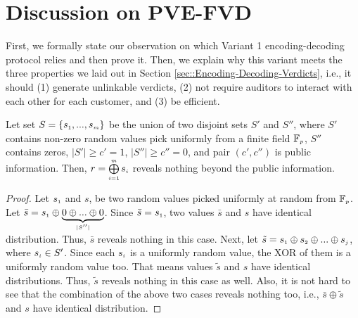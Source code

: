 

\vspace{-3mm}



\section{Discussion on PVE-FVD}\label{sec::Variant-1-Theorem-proof}
\vspace{-.6mm}

First, we formally state our observation on which  Variant 1 encoding-decoding protocol relies and then prove it. Then, we explain why this variant meets the three properties we laid out in Section \ref{sec::Encoding-Decoding-Verdicts}, i.e., it should (1) generate unlinkable verdicts, (2) not require auditors to interact with each other for each customer, and (3) be efficient.

\vspace{-2mm}

\begin{theorem}\label{set-xor}
Let set $S=\{s_{\scriptscriptstyle 1},..., s_{\scriptscriptstyle m}\}$ be the union of  two disjoint sets $S'$ and $S''$, where $S'$ contains non-zero random values pick uniformly  from a finite field $\mathbb{F}_{\scriptscriptstyle p}$, $S''$ contains zeros, $|S'|\geq c'=1$, $|S''|\geq c''=0$, and pair $(c',c'')$ is public information. Then, $r= \bigoplus\limits^{\scriptscriptstyle m}_{\scriptscriptstyle i=1} s_{\scriptscriptstyle i}$ reveals nothing beyond the public information.  
\end{theorem}

\vspace{-3mm}
\begin{proof}
Let $s_{\scriptscriptstyle 1}$ and $s$, be two random values picked uniformly at random from $\mathbb{F}_{\scriptscriptstyle p}$. Let $\bar s=s_{\scriptscriptstyle 1}\oplus \underbrace{0\oplus... \oplus 0}_{\scriptscriptstyle |S''|}$. Since  $\bar s=s_{\scriptscriptstyle 1}$, two values $\bar s$ and $s$ have identical distribution. Thus, $\bar s$ reveals nothing in this case. Next, let $\tilde s={ s_{\scriptscriptstyle 1}\oplus s_{\scriptscriptstyle 2}\oplus... \oplus s_{\scriptscriptstyle j}}$, where $s_{\scriptscriptstyle i}\in S'$. Since each $s_{\scriptscriptstyle i}$ is a uniformly random value,  the XOR of them is a uniformly random value too. That means values $\tilde s$ and $s$ have identical distributions. Thus, $\tilde s$ reveals nothing in this case as well. Also, it is not hard to see that the combination of the above two cases reveals nothing too, i.e., $\bar s\oplus \tilde s$ and $s$ have identical distribution. 
%
\end{proof}


